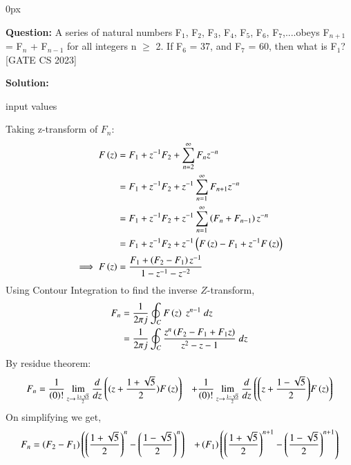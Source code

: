 \documentclass[journal,12pt]{IEEEtran}
\begin{document}
	\parindent 0px
	

	\title{}
	\author{EE23BTECH11209 - K S Ballvardhan$^{*}$}
	\maketitle
	\newpage
	\bigskip
	
	
	
	\textbf{Question:} A series of natural numbers F$_1$, F$_2$, F$_3$, F$_4$, F$_5$, F$_6$, F$_7$,....obeys F$_{n+1}$ = F$_n$ + F$_{n-1}$ for all integers n $\geq$ 2.
	If F$_6$ = 37, and F$_7$ = 60, then what is F$_1$? \hfill[GATE CS 2023]
	
	\textbf{Solution: }
	
	\begin{table}[ht] 
		\centering
		
		\caption{input values}
		\label{tab: Table2022cs36}
	\end{table}
    Taking z-transform of $ F_n$:
	\begin{align}
		F\left(z\right) &= F_1 + z^{-1} F_2 + \sum_{n=2}^{\infty} F_n z^{-n}\\
	    &= F_1 + z^{-1} F_2 + z^{-1} \sum_{n=1}^{\infty} F_{n+1} z^{-n}\\
	    &= F_1 + z^{-1} F_2 + z^{-1} \sum_{n=1}^{\infty} \left(F_n + F_{n-1}\right)z^{-n}\\
	    &= F_1 + z^{-1} F_2 + z^{-1}\left(F\left(z\right)-F_1 + z^{-1}F\left(z\right)\right)\\
		\implies F\left(z\right)&= \frac{F_1 + \left(F_2-F_1\right)z^{-1}}{1-z^{-1}-z^{-2}}
	\end{align}
	Using Contour Integration to find the inverse $Z$-transform,
	\begin{align}
		F_{n}&=\frac{1}{2\pi j}\oint_{C} F\left(z\right) \;z^{n-1} \;dz  \\
		&=\frac{1}{2\pi j}\oint_{C}\frac{z^{n}\left(F_2-F_1+F_1 z\right)}{z^2-z-1} \;dz 
	\end{align}
	By residue theorem:
	\begin{align}
		F_n&=\frac{1}{\left(0\right)!}\lim\limits_{z\to {\frac{1+\sqrt{5}}{2}}}\frac{d}{dz}\left({(z+\frac{1+\sqrt{5}}{2})}F\left(z\right)\right) &+ \frac{1}{\left(0\right)!}\lim\limits_{z\to \frac{1-\sqrt{5}}{2}}\frac{d}{dz}\left({\left(z+\frac{1-\sqrt{5}}{2}\right)}F\left(z\right)\right)
	\end{align}
	On simplifying we get,
	\begin{align}
		F_n &= \left(F_2-F_1\right)\left(\left(\frac{1+\sqrt{5}}{2}\right)^n-\left(\frac{1-\sqrt{5}}{2}\right)^n\right) &+ \left(F_1\right)\left(\left(\frac{1+\sqrt{5}}{2}\right)^{n+1}-\left(\frac{1-\sqrt{5}}{2}\right)^{n+1}\right)
	\end{align}
\end{document}
